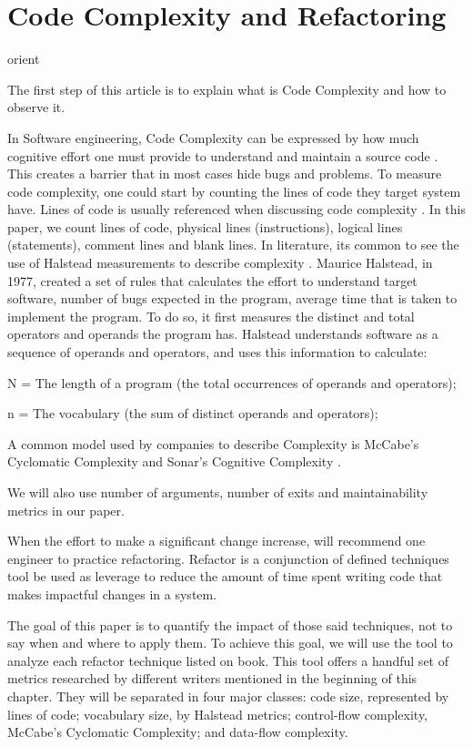 \section{Code Complexity and Refactoring} orient

The first step of this article is to explain what is Code Complexity and how to observe it.

In Software engineering, Code Complexity can be expressed by how much cognitive effort one must provide to understand
and maintain a source code \cite{article:fmricc}. This creates a barrier that in most cases hide bugs and problems.
To measure code complexity, one could start by counting the lines of code they target system have. Lines of code is usually
referenced when discussing code complexity \cite{article:rustcc}. In this paper, we count lines of code, physical lines (instructions),
logical lines (statements), comment lines and blank lines.
In literature, its common to see the use of Halstead measurements to describe complexity \cite{article:complexity_with_halstead}.
Maurice Halstead, in 1977, created a set of rules that calculates the effort to understand target software, number of bugs
expected in the program, average time that is taken to implement the program. To do so, it first measures the distinct and total
operators and operands the program has. Halstead understands software as a sequence of operands and operators, and uses
this information to calculate:

N = The length of a program (the total occurrences of operands and operators);

n = The vocabulary (the sum of distinct operands and operators);


A common model used by companies to describe Complexity is McCabe's Cyclomatic Complexity and Sonar's Cognitive Complexity
\cite{article:sonarpaper}.

We will also use number of arguments, number of exits and maintainability metrics in our paper.


When the effort to make a significant change increase, \cite{book:refactoring} will recommend one engineer to practice
refactoring. Refactor is a conjunction of defined techniques tool be used as leverage to reduce the amount of time spent
writing code that makes impactful changes in a system.

The goal of this paper is to quantify the impact of those said techniques, not to say when and where to apply them.
To achieve this goal, we will use the \cite{article:mozilla} tool to analyze each refactor technique listed on
\cite{book:refactoring} book. This tool offers a handful set of metrics researched by
different writers mentioned in the beginning of this chapter. They will be separated in four major classes: code size,
represented by lines of code; vocabulary size, by Halstead metrics; control-flow complexity, McCabe's Cyclomatic
Complexity; and data-flow complexity.

